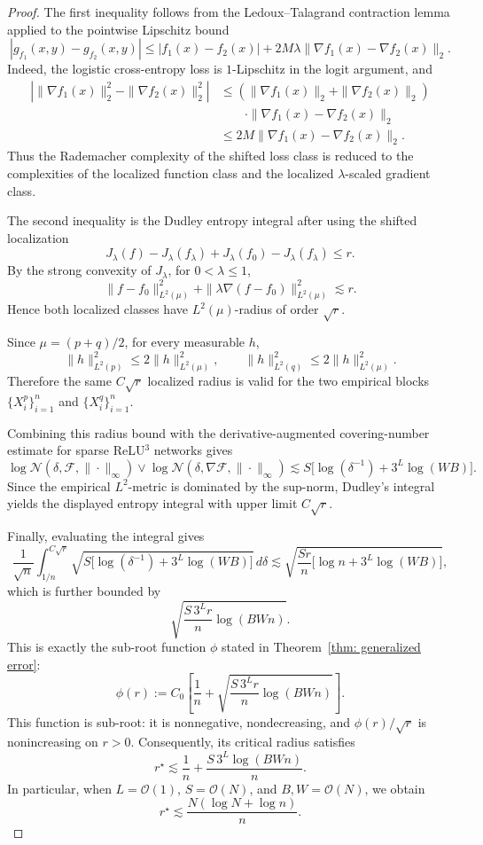 \documentclass[11pt]{article}
\theoremstyle{plain}
\theoremstyle{definition}
\theoremstyle{remark}
\begin{document}
\begin{proof}
The first inequality follows from the Ledoux--Talagrand contraction lemma
applied to the pointwise Lipschitz bound
\[
|g_{f_1}(x,y)-g_{f_2}(x,y)|
\le
|f_1(x)-f_2(x)|
+
2M\lambda\|\nabla f_1(x)-\nabla f_2(x)\|_2.
\]
Indeed, the logistic cross-entropy loss is \(1\)-Lipschitz in the logit
argument, and
\[
\begin{aligned}
\left|
\|\nabla f_1(x)\|_2^2-\|\nabla f_2(x)\|_2^2
\right|
&\le
\left(\|\nabla f_1(x)\|_2+\|\nabla f_2(x)\|_2\right)\\
&\qquad\cdot
\|\nabla f_1(x)-\nabla f_2(x)\|_2\\
&\le
2M\|\nabla f_1(x)-\nabla f_2(x)\|_2.
\end{aligned}
\]
Thus the Rademacher complexity of the shifted loss class is reduced to the
complexities of the localized function class and the localized
\(\lambda\)-scaled gradient class.

The second inequality is the Dudley entropy integral after using the shifted
localization
\[
J_\lambda(f)-J_\lambda(f_\lambda)
+
J_\lambda(f_0)-J_\lambda(f_\lambda)
\le r.
\]
By the strong convexity of \(J_\lambda\), for \(0<\lambda\le 1\),
\[
\|f-f_0\|_{L^2(\mu)}^2
+
\|\lambda\nabla(f-f_0)\|_{L^2(\mu)}^2
\lesssim r.
\]
Hence both localized classes have \(L^2(\mu)\)-radius of order \(\sqrt r\).


Since \(\mu=(p+q)/2\), for every measurable \(h\),
\[
\|h\|_{L^2(p)}^2\le 2\|h\|_{L^2(\mu)}^2,
\qquad
\|h\|_{L^2(q)}^2\le 2\|h\|_{L^2(\mu)}^2.
\]
Therefore the same \(C\sqrt r\) localized radius is valid for the two
empirical blocks \(\{X_i^p\}_{i=1}^n\) and \(\{X_i^q\}_{i=1}^n\).

Combining this radius bound with the derivative-augmented covering-number
estimate for sparse ReLU\(^3\) networks gives
\[
\log \mathcal N
\left(
\delta,\mathcal F,\|\cdot\|_\infty
\right)
\vee
\log \mathcal N
\left(
\delta,\nabla\mathcal F,\|\cdot\|_\infty
\right)
\lesssim
S\Big[
\log(\delta^{-1})+3^L\log(WB)
\Big].
\]
Since the empirical \(L^2\)-metric is dominated by the sup-norm, Dudley's
integral yields the displayed entropy integral with upper limit \(C\sqrt r\).

Finally, evaluating the integral gives
\[
\frac1{\sqrt n}
\int_{1/n}^{C\sqrt r}
\sqrt{
S\Big[
\log(\delta^{-1})+3^L\log(WB)
\Big]
}
\,d\delta
\lesssim
\sqrt{
\frac{S r}{n}
\Big[
\log n+3^L\log(WB)
\Big]
},
\]
which is further bounded by
\[
\sqrt{
\frac{S\,3^L r}{n}\log(BWn)
}.
\]
This is exactly the sub-root function \(\phi\) stated in
Theorem~\ref{thm: generalized error}:
\[
\phi(r):=
C_0\left[
\frac{1}{n}
+
\sqrt{
\frac{S\,3^L r}{n}\log(BWn)
}
\right].
\]
This function is sub-root: it is nonnegative, nondecreasing, and
\(\phi(r)/\sqrt r\) is nonincreasing on \(r>0\). Consequently, its critical
radius satisfies
\[
r^\star
\lesssim
\frac1n+
\frac{S\,3^L\log(BWn)}{n}.
\]
In particular, when \(L=\mathcal{O}(1)\), \(S=\mathcal{O}(N)\), and \(B,W=\mathcal{O}(N)\), we obtain
\[
r^\star
\lesssim
\frac{N(\log N+\log n)}{n}.
\]


\end{proof}
\end{document}
